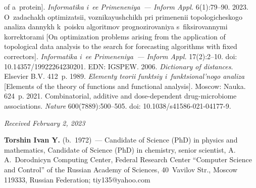 \begin{multicols}{2}
{{\begin{thebibliography}{9}
\noindent
 of a~protein]. 
\textit{Informatika i~ee Primeneniya~--- Inform Appl.} 6(1):79--90.
 2023. O~za\-da\-chakh op\-ti\-mi\-za\-tsii, voz\-ni\-ka\-yushchikh  
pri pri\-me\-ne\-nii to\-po\-lo\-gi\-che\-sko\-go ana\-li\-za dan\-nykh k~pois\-ku al\-go\-rit\-mov 
prog\-no\-zi\-ro\-va\-niya s~fik\-si\-ro\-van\-ny\-mi kor\-rek\-to\-ra\-mi [On optimization 
problems arising from the application of topological data analysis to the search for forecasting 
algorithms with fixed correctors]. \textit{Informatika i~ee Primeneniya~--- Inform Appl.} 
17(2):2--10. doi: 10.14357/19922264230201. EDN: IGSPEW.
 2006. \textit{Dictionary of distances}.  Elsevier B.V. 412~p.
 1989. \textit{Ele\-men\-ty teo\-rii funk\-tsiy 
i~funk\-tsi\-o\-nal'\-no\-go ana\-li\-za} [Elements of the theory of functions and functional 
analysis]. Moscow: Nauka. %
624~p.
 2021. Combinatorial, 
additive and dose-dependent drug-microbiome associations. \textit{Nature} 600(7889):500--505. 
doi: 10.1038/s41586-021-04177-9.

\end{thebibliography}

 }
 }

\end{multicols}

\vspace*{-6pt}

\hfill{\small\textit{Received February 2, 2023}} 

  \Contrl
  
  \noindent
  \textbf{Torshin Ivan Y.} (b.\ 1972)~--- Candidate of Science (PhD) in physics and mathematics, 
Candidate of Science (PhD) in chemistry, senior scientist, A.\,A.~Dorodnicyn Computing Center, 
Federal Research Center ``Computer Science and Control'' of the Russian Academy of Sciences, 
40~Vavilov Str., Moscow 119333, Russian Federation; \mbox{tiy135@yahoo.com}




\label{end\stat}

\renewcommand{\bibname}{\protect\rm Литература} 
